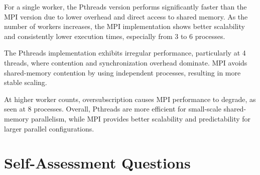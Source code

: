 \documentclass[12pt,a4paper]{article}
\begin{document}
For a single worker, the Pthreads version performs significantly faster than
the MPI version due to lower overhead and direct access to shared memory.
As the number of workers increases, the MPI implementation shows better
scalability and consistently lower execution times, especially from 3 to
6 processes.

The Pthreads implementation exhibits irregular performance, particularly at
4 threads, where contention and synchronization overhead dominate.
MPI avoids shared-memory contention by using independent processes, resulting
in more stable scaling.

At higher worker counts, oversubscription causes MPI performance to degrade,
as seen at 8 processes.
Overall, Pthreads are more efficient for small-scale shared-memory parallelism,
while MPI provides better scalability and predictability for larger parallel
configurations.

\section{Self-Assessment Questions}
\end{document}
